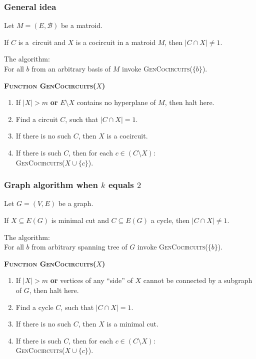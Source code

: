 \documentclass[10pt]{beamer}
\begin{document}
\begin{frame}[fragile]
    \frametitle{General idea}

	Let $M = (E, \mathcal{B})$ be a matroid. \\

	\bigskip

	If $C$ is a~circuit and $X$ is a cocircuit in a matroid $M$, then ${\lvert C \cap X \rvert \neq 1}$.

	\bigskip

	The algorithm:\\
    For all $b$ from an arbitrary basis of $M$ invoke \textsc{GenCocircuits}($\{b\}$).

	\textbf{\textsc{Function GenCocircuits}($X$)}
	\begin{enumerate}
		\item If $\lvert X \rvert > m$ \textbf{or} $E \setminus X$ contains no hyperplane of $M$, then halt here.
		\item Find a circuit $C$, such that $\lvert C \cap X \rvert = 1$.
		\item If there is no such $C$, then $X$ is a cocircuit.
		\item If there is such $C$, then for each $c \in (C \setminus X)$: \\
			\hspace{12pt} \textsc{GenCocircuits}($X \cup \{c\}$).
	\end{enumerate}

\end{frame}

\begin{frame}[fragile]
	\frametitle{Graph algorithm when $k$ equals $2$}

	Let $G = (V, E)$ be a graph. \\

	\bigskip

	If $X \subseteq E(G)$ is minimal cut and $C \subseteq E(G)$ a cycle,
    then $\lvert C \cap X \rvert \neq 1$.

    \bigskip

	The algorithm:\\
    For all $b$ from arbitrary spanning tree of $G$ invoke \textsc{GenCocircuits}($\{b\}$).

	\textbf{\textsc{Function GenCocircuits}($X$)}
	\begin{enumerate}
		\item If $\lvert X \rvert > m$ \textbf{or} vertices of any
            ``side'' of $X$ cannot be connected by a subgraph of $G$,
            then halt here.
		\item Find a cycle $C$, such that $\lvert C \cap X \rvert = 1$.
		\item If there is no such $C$, then $X$ is a minimal cut.
		\item If there is such $C$, then for each $c \in (C \setminus X)$: \\
			\hspace{12pt} \textsc{GenCocircuits}($X \cup \{c\}$).
	\end{enumerate}

\end{frame}
\end{document}
